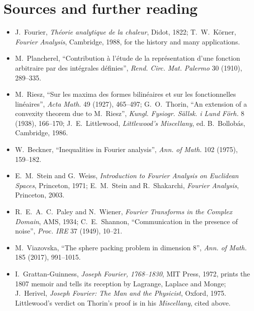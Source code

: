 \section*{Sources and further reading}

\begin{itemize}
\item J.~Fourier, \emph{Th\'eorie analytique de la chaleur}, Didot, 1822; T.~W.~K\"orner, \emph{Fourier Analysis}, Cambridge, 1988, for the history and many applications.
\item M.~Plancherel, ``Contribution \`a l'\'etude de la repr\'esentation d'une fonction arbitraire par des int\'egrales d\'efinies'', \emph{Rend. Circ. Mat. Palermo} 30 (1910), 289--335.
\item M.~Riesz, ``Sur les maxima des formes bilin\'eaires et sur les fonctionnelles lin\'eaires'', \emph{Acta Math.} 49 (1927), 465--497; G.~O.~Thorin, ``An extension of a convexity theorem due to M.~Riesz'',
\emph{Kungl. Fysiogr. S\"allsk. i Lund F\"orh.} 8 (1938), 166--170; J.~E.~Littlewood, \emph{Littlewood's Miscellany}, ed. B.~Bollob\'as, Cambridge, 1986.
\item W.~Beckner, ``Inequalities in Fourier analysis'', \emph{Ann. of Math.} 102 (1975), 159--182.
\item E.~M.~Stein and G.~Weiss, \emph{Introduction to Fourier Analysis on Euclidean Spaces}, Princeton, 1971; E.~M.~Stein and R.~Shakarchi, \emph{Fourier Analysis}, Princeton, 2003.
\item R.~E.~A.~C.~Paley and N.~Wiener, \emph{Fourier Transforms in the Complex Domain}, AMS, 1934; C.~E.~Shannon, ``Communication in the presence of noise'', \emph{Proc. IRE} 37 (1949), 10--21.
\item M.~Viazovska, ``The sphere packing problem in dimension 8'', \emph{Ann. of Math.} 185 (2017), 991--1015.
\item I.~Grattan-Guinness, \emph{Joseph Fourier, 1768--1830}, MIT Press, 1972, prints the 1807 memoir and tells its reception by Lagrange, Laplace and
Monge; J.~Herivel, \emph{Joseph Fourier: The Man and the Physicist}, Oxford, 1975. Littlewood's verdict on Thorin's proof is in his \emph{Miscellany}, cited above.
\end{itemize}
